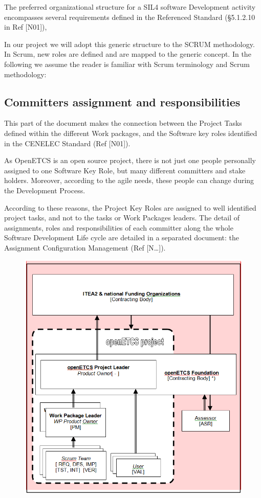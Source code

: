 \documentclass{template/openetcs_article}
\begin{document}
The preferred organizational structure for a SIL4 software Development activity encompasses several requirements defined in the Referenced Standard ({\S}5.1.2.10 in Ref [N01]),

In our project we will adopt this generic structure to the SCRUM methodology. In Scrum, new roles are defined and are mapped to the generic concept. In the following we assume the reader is familiar with Scrum terminology and Scrum methodology:


\subsection{Committers assignment and responsibilities}
This part of the document makes the connection between the Project Tasks defined within the different Work packages, and the Software key roles identified in the CENELEC Standard (Ref [N01]).

As OpenETCS is an open source project, there is not just one people personally assigned to one Software Key Role, but many different committers and stake holders. Moreover, according to the agile needs, these people can change during the Development Process.

According to these reasons, the Project Key Roles are assigned to well identified project tasks, and not to the tasks or Work Packages leaders. The detail of assignments, roles and responsibilities of each committer along the whole Software Development Life cycle are detailed in a separated document: the Assignment Configuration Management (Ref [N{\dots}]).


\begin{figure}
\includegraphics[width=\textwidth]{./figures/organization.PNG}
\end{figure}
\end{document}
